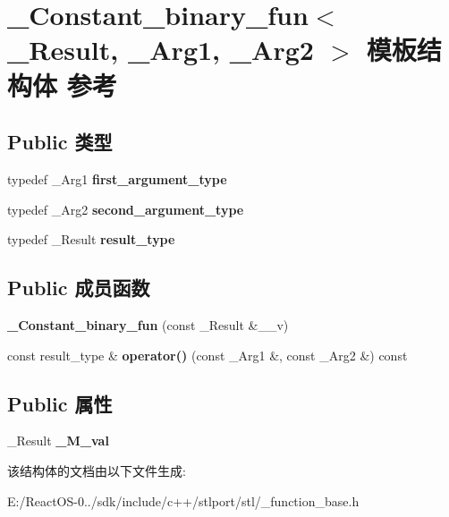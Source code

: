 \hypertarget{struct___constant__binary__fun}{}\section{\+\_\+\+Constant\+\_\+binary\+\_\+fun$<$ \+\_\+\+Result, \+\_\+\+Arg1, \+\_\+\+Arg2 $>$ 模板结构体 参考}
\label{struct___constant__binary__fun}
\subsection*{Public 类型}
\begin{DoxyCompactItemize}
\item 
\mbox{\label{struct___constant__binary__fun_ad3936d1524b18fc301561e97598034fb}} 
typedef \+\_\+\+Arg1 {\bfseries first\+\_\+argument\+\_\+type}
\item 
\mbox{\label{struct___constant__binary__fun_a41530055005bc3aeb7f04f7a44b345da}} 
typedef \+\_\+\+Arg2 {\bfseries second\+\_\+argument\+\_\+type}
\item 
\mbox{\label{struct___constant__binary__fun_ade553f1cee2eb50cbc2d210d3b5fcc32}} 
typedef \+\_\+\+Result {\bfseries result\+\_\+type}
\end{DoxyCompactItemize}
\subsection*{Public 成员函数}
\begin{DoxyCompactItemize}
\item 
\mbox{\label{struct___constant__binary__fun_a1cd428b0789dcf80ca4fcfc6065ae043}} 
{\bfseries \+\_\+\+Constant\+\_\+binary\+\_\+fun} (const \+\_\+\+Result \&\+\_\+\+\_\+v)
\item 
\mbox{\label{struct___constant__binary__fun_a70882a4a02a2654f82bb556387efe410}} 
const result\+\_\+type \& {\bfseries operator()} (const \+\_\+\+Arg1 \&, const \+\_\+\+Arg2 \&) const
\end{DoxyCompactItemize}
\subsection*{Public 属性}
\begin{DoxyCompactItemize}
\item 
\mbox{\label{struct___constant__binary__fun_a49652cb602aa2caee59314210d49307b}} 
\+\_\+\+Result {\bfseries \+\_\+\+M\+\_\+val}
\end{DoxyCompactItemize}


该结构体的文档由以下文件生成\+:\begin{DoxyCompactItemize}
\item 
E\+:/\+React\+O\+S-\/0../sdk/include/c++/stlport/stl/\+\_\+function\+\_\+base.\+h\end{DoxyCompactItemize}
